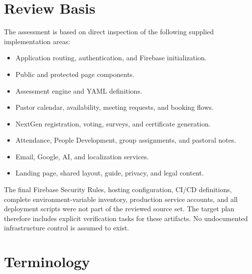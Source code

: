 \documentclass[11pt,a4paper,oneside]{report}
\begin{document}
\section{Review Basis}

The assessment is based on direct inspection of the following supplied implementation areas:

\begin{itemize}
  \item Application routing, authentication, and Firebase initialization.
  \item Public and protected page components.
  \item Assessment engine and YAML definitions.
  \item Pastor calendar, availability, meeting requests, and booking flows.
  \item NextGen registration, voting, surveys, and certificate generation.
  \item Attendance, People Development, group assignments, and pastoral notes.
  \item Email, Google, AI, and localization services.
  \item Landing page, shared layout, guide, privacy, and legal content.
\end{itemize}

\begin{notebox}
The final Firebase Security Rules, hosting configuration, CI/CD definitions, complete environment-variable inventory, production service accounts, and all deployment scripts were not part of the reviewed source set. The target plan therefore includes explicit verification tasks for these artifacts. No undocumented infrastructure control is assumed to exist.
\end{notebox}

\section{Terminology}
\end{document}
